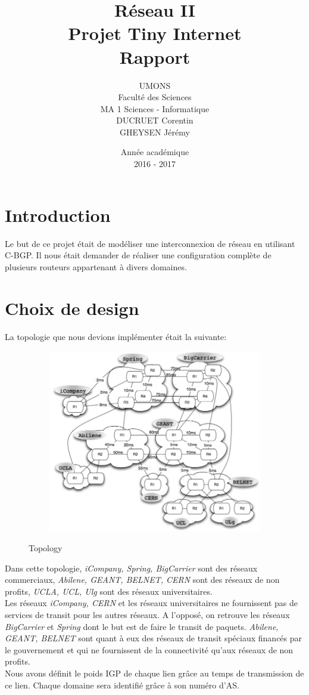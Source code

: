 \documentclass[a4paper,12pt]{report} %
\title{Réseau II \\ Projet Tiny Internet\\ Rapport}
\author{UMONS\\Faculté des Sciences\\MA 1 Sciences - Informatique\\DUCRUET Corentin \\GHEYSEN Jérémy}
\date{Année académique\\2016 - 2017}
\begin{document}
 
\maketitle
\newpage 
\tableofcontents 
\newpage
\raggedright

\section{Introduction}
Le but de ce projet était de modéliser une interconnexion de réseau en utilisant C-BGP. Il nous était demander de réaliser une configuration complète de plusieurs routeurs appartenant à divers domaines.

\section{Choix de design}
La topologie que nous devions implémenter était la suivante:
\begin{figure}[!h] %
		\centering
		\includegraphics[width=120mm,height=80mm]{topologie}
		\label{topo}
		\caption{Topology}
	\end{figure} 

Dans cette topologie, \textit{iCompany, Spring, BigCarrier} sont des réseaux commerciaux,  \textit{Abilene, GEANT, BELNET, CERN} sont des réseaux de non profits, \textit{UCLA, UCL, Ulg} sont des réseaux universitaires.\\
Les réseaux \textit{iCompany, CERN} et les réseaux universitaires ne fournissent pas de services de transit pour les autres réseaux. A l'opposé, on retrouve les réseaux \textit{BigCarrier} et \textit{Spring} dont le but est de faire le transit de paquets. \textit{Abilene, GEANT, BELNET} sont quant à eux des réseaux de transit spéciaux financés par le gouvernement et qui ne fournissent de la connectivité qu'aux réseaux  de non profits.\\
Nous avons définit le poids IGP de chaque lien grâce au temps de transmission de ce lien. Chaque domaine sera identifié grâce à son numéro d'AS.\\
\end{document}
